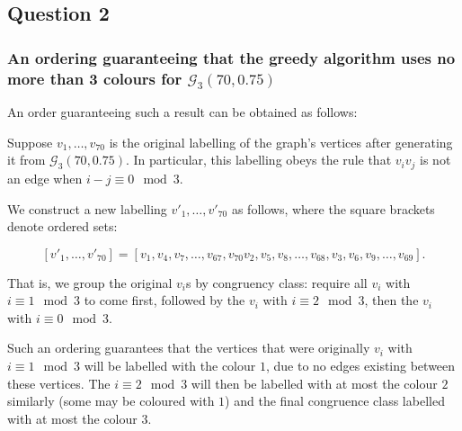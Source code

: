 \documentclass{article}
\begin{document}



\subsection{Question 2}

\subsubsection{An ordering guaranteeing that the greedy algorithm uses no more than 3 colours for $\mathcal{G}_3(70, 0.75)$}

An order guaranteeing such a result can be obtained as follows:

Suppose $v_1, \dots, v_{70}$ is the original labelling of the graph's vertices after generating it from $\mathcal{G}_3(70, 0.75)$. In particular, this labelling obeys the rule that $v_i v_j$ is not an edge when $i - j \equiv 0 \mod 3$.

We construct a new labelling $v'_1, \dots, v'_{70}$ as follows, where the square brackets denote ordered sets:

$$[v'_1, \dots, v'_{70}] = [v_1, v_4, v_7, \dots, v_{67}, v_{70} v_2, v_5, v_8, \dots, v_{68}, v_3, v_6, v_9, \dots, v_{69}].$$

That is, we group the original $v_i$s by congruency class: require all $v_i$ with $i \equiv 1 \mod 3$ to come first, followed by the $v_i$ with $i \equiv 2 \mod 3$, then the $v_i$ with $i \equiv 0 \mod 3$.

Such an ordering guarantees that the vertices that were originally $v_i$ with $i \equiv 1 \mod 3$ will be labelled with the colour $1$, due to no edges existing between these vertices. The $i \equiv 2 \mod 3$ will then be labelled with at most the colour $2$ similarly (some may be coloured with $1$) and the final congruence class labelled with at most the colour $3$.
\end{document}
